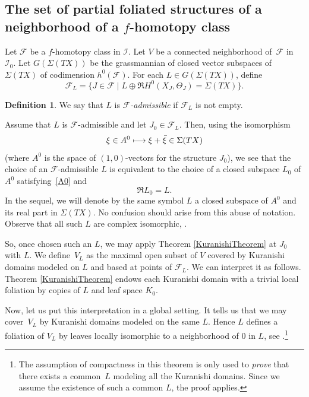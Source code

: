 \documentclass[10pt]{amsart}
\let\mathcal\mathscr
\def\mto{\mathchoice{\longmapsto}{\mapsto}{\mapsto}{\mapsto}}
\theoremstyle{plain}
\theoremstyle{definition}
\newtheorem{definition}[theorem]{Definition}
\theoremstyle{remark}
\numberwithin{equation}{section}
\newcommand{\cI}{\mathcal{I}}
\begin{document}
\subsection{The set of partial foliated structures of a neighborhood of a $f$-homotopy class}
\label{multifoliatefclass}
Let $\mathcal F$ be a $f$-homotopy class in $\cI$. Let $V$ be a connected neighborhood of~$\mathcal F$ in $\cI_0$. Let $G(\Sigma(TX))$ be the grassmannian of closed vector subspaces of $\Sigma (TX)$ of codimension $h^0(\mathcal F)$. For each $L\in G(\Sigma (TX))$,
define
\begin{equation}
\label{FL}
\mathcal F_L=\{J\in\mathcal F\mid L\oplus \Re H^0(X_J,\Theta_J)=\Sigma(TX)\}.
\end{equation}

\begin{definition}
\label{Fadmissible}
We say that $L$ is \emph{$\mathcal F$-admissible} if $\mathcal F_L$ is not empty.
\end{definition}

Assume that $L$ is $\mathcal F$-admissible and let $J_0\in\mathcal F_L$. Then, using the isomorphism
\begin{equation}
\label{real}
\xi\in A^0\mto \xi+\bar\xi\in \Sigma (TX)
\end{equation}
(where $A^0$ is the space of $(1,0)$-vectors for the structure $J_0$), we see that the choice of an $\mathcal F$-admissible $L$ is equivalent to the choice of a closed subspace $L_0$ of $A^0$ satisfying~\eqref{A0} and
\begin{equation}
\label{L0L}
\Re L_0=L.
\end{equation}
In the sequel, we will denote by the same symbol $L$ a closed subspace of $A^0$ and its real part in $\Sigma (TX)$. No confusion should arise from this abuse of notation. Observe that all such $L$ are complex isomorphic, \cf \cite[Lem.\,7.1]{circle}.

So, once chosen such an $L$, we may apply Theorem \ref{KuranishiTheorem} at $J_0$ with $L$.
We define~$V_L$ as the maximal open subset of $V$ covered by Kuranishi domains modeled on $L$ and based at points of $\mathcal F_L$. We can interpret it as follows. Theorem \ref{KuranishiTheorem} endows each Kuranishi domain with a trivial local foliation by copies of $L$ and leaf space $K_0$.

Now, let us put this interpretation in a global setting. It tells us that we may cover~$V_L$ by Kuranishi domains modeled on the same $L$.
Hence $L$ defines a foliation of $V_L$ by leaves locally isomorphic to a neighborhood of $0$ in $L$, see \cite[Th.\,7.2]{circle}.\footnote{The assumption of compactness in this theorem is only used to \emph{prove} that there exists a common~$L$ modeling all the Kuranishi domains. Since we assume the existence of such a common $L$, the proof applies.}
\end{document}
